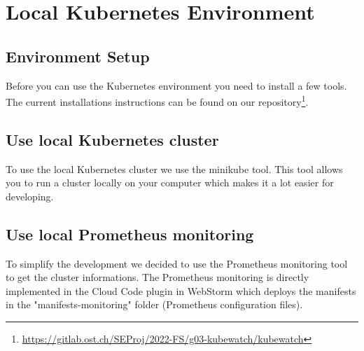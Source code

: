 \chapter{Local Kubernetes Environment}

\section{Environment Setup}
Before you can use the Kubernetes environment you need to install a few tools. The current installations instructions can be found on our repository\footnote{\url{https://gitlab.ost.ch/SEProj/2022-FS/g03-kubewatch/kubewatch}}.


\section{Use local Kubernetes cluster}
To use the local Kubernetes cluster we use the minikube tool. This tool allows you to run a cluster locally on your computer which makes it a lot easier for developing.



\section{Use local Prometheus monitoring}
To simplify the development we decided to use the Prometheus monitoring tool to get the cluster informations. The Prometheus monitoring is directly implemented in the Cloud Code plugin in WebStorm which deploys the manifests in the "manifests-monitoring" folder (Prometheus configuration files).

